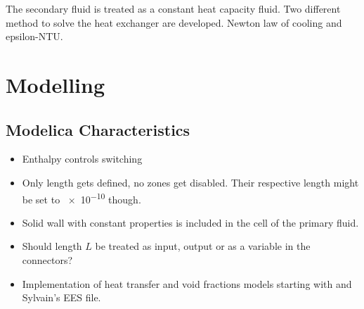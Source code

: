 \documentclass[11pt]{article} %
\begin{document}
The secondary fluid is treated as a constant heat capacity fluid. Two different method to solve the heat exchanger are developed. Newton law of cooling and epsilon-NTU.


\section{Modelling}

\subsection{Modelica Characteristics}

\begin{itemize}
\item Enthalpy controls switching
\item Only length gets defined, no zones get disabled. Their respective length might be set to \num{e-10} though. 
\item Solid wall with constant properties is included in the cell of the primary fluid. 
\item Should length $L$ be treated as input, output or as a variable in the connectors?
\item Implementation of heat transfer and void fractions models starting with \cite{Kaern2011b} and Sylvain's EES file.
\end{itemize}














%
%
\end{document}
